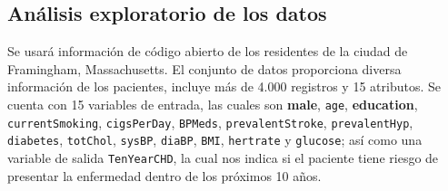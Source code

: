\documentclass{article}
\begin{document}
    \subsection{Análisis exploratorio de los datos}\label{data}

    Se usará información de código abierto de los residentes de la ciudad de Framingham, Massachusetts. El conjunto de datos proporciona diversa información de los pacientes, incluye más de 4.000 registros y 15 atributos. Se cuenta con 15 variables de entrada, las cuales son \textbf{male}, \texttt{age}, \textbf{education}, \texttt{currentSmoking}, \texttt{cigsPerDay}, \texttt{BPMeds}, \texttt{prevalentStroke}, \texttt{prevalentHyp}, \texttt{diabetes}, \texttt{totChol}, \texttt{sysBP}, \texttt{diaBP}, \texttt{BMI}, \texttt{hertrate} y \texttt{glucose}; así como  una variable de salida \texttt{TenYearCHD}, la cual nos indica si el paciente tiene riesgo de presentar la enfermedad dentro de los próximos 10 años.
\end{document}
